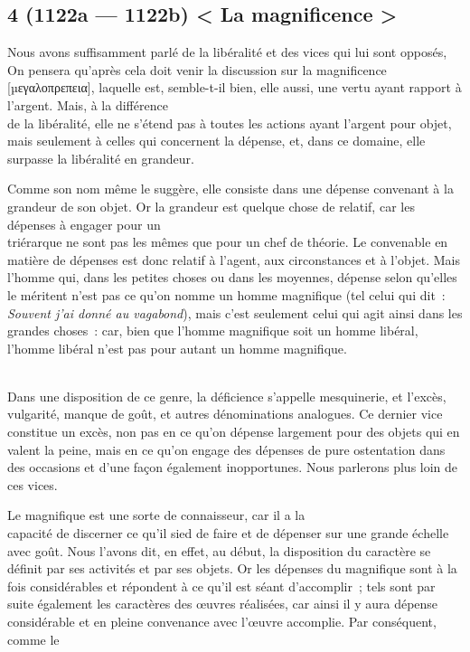 \documentclass[french,twoside]{book} %
\begin{document}
\subsection[{4 (1122a — 1122b) < La magnificence >}]{4 (1122a — 1122b) < La magnificence >}
\noindent Nous avons suffisamment parlé de la libéralité et des vices qui lui sont opposés, On pensera qu’après cela doit venir la discussion sur la magnificence [µεγαλοπρεπεια], laquelle est, semble-t-il bien, elle aussi, une vertu ayant rapport à l’argent. Mais, à la différence \\
de la libéralité, elle ne s’étend pas à toutes les actions ayant l’argent pour objet, mais seulement à celles qui concernent la dépense, et, dans ce domaine, elle surpasse la libéralité en grandeur.\par
Comme son nom même le suggère, elle consiste dans une dépense convenant à la grandeur de son objet. Or la grandeur est quelque chose de relatif, car les dépenses à engager pour un \\
triérarque ne sont pas les mêmes que pour un chef de théorie. Le convenable en matière de dépenses est donc relatif à l’agent, aux circonstances et à l’objet. Mais l’homme qui, dans les petites choses ou dans les moyennes, dépense selon qu’elles le méritent n’est pas ce qu’on nomme un homme magnifique (tel celui qui dit : {\itshape Souvent j’ai donné au vagabond}), mais c’est seulement celui qui agit ainsi dans les grandes choses : car, bien que l’homme magnifique soit un homme libéral, l’homme libéral n’est pas pour autant un homme magnifique.\par
\\
Dans une disposition de ce genre, la déficience s’appelle mesquinerie, et l’excès, vulgarité, manque de goût, et autres dénominations analogues. Ce dernier vice constitue un excès, non pas en ce qu’on dépense largement pour des objets qui en valent la peine, mais en ce qu’on engage des dépenses de pure ostentation dans des occasions et d’une façon également inopportunes. Nous parlerons plus loin de ces vices.\par
Le magnifique est une sorte de connaisseur, car il a la \\
capacité de discerner ce qu’il sied de faire et de dépenser sur  une grande échelle avec goût. Nous l’avons dit, en effet, au début, la disposition du caractère se définit par ses activités et par ses objets. Or les dépenses du magnifique sont à la fois considérables et répondent à ce qu’il est séant d’accomplir ; tels sont par suite également les caractères des œuvres réalisées, car ainsi il y aura dépense considérable et en pleine convenance avec l’œuvre accomplie. Par conséquent, comme le \\
\end{document}
